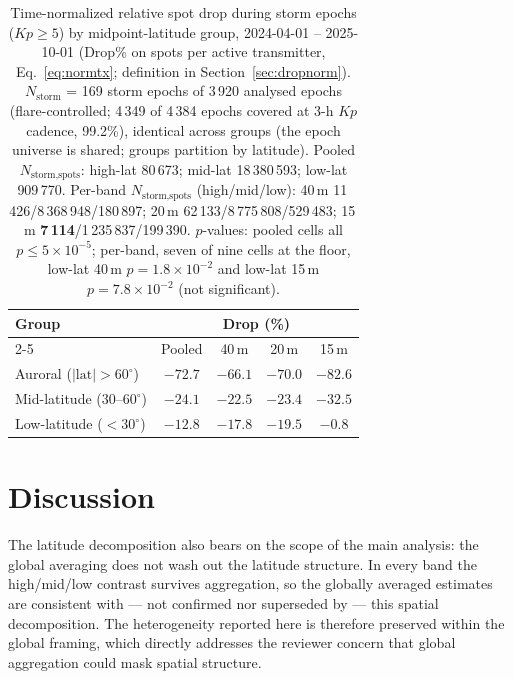 \documentclass{agujournal2019}
\begin{document}
\begin{table}[h]
	\centering
	\small
	\caption{Time-normalized relative spot drop during storm epochs
	($Kp \ge 5$) by midpoint-latitude group, 2024-04-01 -- 2025-10-01
	(Drop\% on spots per active transmitter, Eq.~\eqref{eq:normtx};
	definition in Section~\ref{sec:dropnorm}). $N_{\text{storm}}$ = 169
	storm epochs of 3\,920 analysed epochs (flare-controlled; 4\,349 of
	4\,384 epochs covered at 3-h $Kp$ cadence, 99.2\%), identical across
	groups (the epoch universe is shared; groups
	partition by latitude). Pooled $N_{\text{storm,spots}}$: high-lat
	80\,673; mid-lat 18\,380\,593; low-lat 909\,770. Per-band
	$N_{\text{storm,spots}}$ (high/mid/low): 40\,m
	11\,426/8\,368\,948/180\,897; 20\,m 62\,133/8\,775\,808/529\,483;
	15\,m \textbf{7\,114}/1\,235\,837/199\,390. $p$-values: pooled cells all $p \le 5 \times 10^{-5}$; per-band, seven of nine
	cells at the floor, low-lat 40\,m $p = 1.8 \times 10^{-2}$ and low-lat
	15\,m $p = 7.8 \times 10^{-2}$ (not significant).}
	\label{tab:spatial}
	\begin{tabular}{lcccc}
		\toprule
		Group & \multicolumn{4}{c}{Drop (\%)} \\
		\cmidrule(lr){2-5}
		 & Pooled & 40\,m & 20\,m & 15\,m \\
		\midrule
		Auroral ($|\mathrm{lat}| > 60^\circ$) & $-72.7$ & $-66.1$ & $-70.0$ & $-82.6$ \\
		Mid-latitude ($30$--$60^\circ$) & $-24.1$ & $-22.5$ & $-23.4$ & $-32.5$ \\
		Low-latitude ($< 30^\circ$) & $-12.8$ & $-17.8$ & $-19.5$ & $-0.8$ \\
		\bottomrule
	\end{tabular}
\end{table}

\section{Discussion}

The latitude decomposition also bears on the scope of the main
analysis: the global averaging does not wash out the latitude
structure. In every band the high/mid/low contrast survives
aggregation, so the globally averaged estimates are consistent with
--- not confirmed nor superseded by --- this spatial decomposition.
The heterogeneity reported here is therefore preserved within the
global framing, which directly addresses the reviewer concern that
global aggregation could mask spatial structure.
\end{document}
